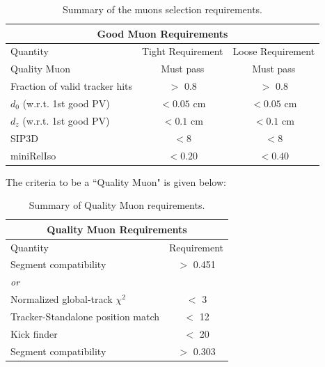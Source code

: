     \begin{table}[!h]
      \begin{center}
        \caption{\label{table:muons} Summary of the muons selection requirements. }
        \begin{tabular}{l|c|c}
          \hline
          \hline
          \multicolumn{3}{c}{Good Muon Requirements} \\
          \hline
          Quantity   &  Tight Requirement & Loose Requirement \\
          \hline
          Quality Muon                      & Must pass   & Must pass     \\
          Fraction of valid tracker hits    & $>$ 0.8     & $>$ 0.8  \\ 
          \hline
          $d_{0}$ (w.r.t. 1st good PV)   & $<0.05$ cm & $<0.05$ cm \\
          $d_{z}$ (w.r.t. 1st good PV)   & $<0.1$ cm  & $<0.1$ cm  \\
          SIP3D                          & $< 8$      & $< 8$      \\
          miniRelIso                     & $<0.20$    & $<0.40$       \\
          \hline
        \end{tabular}
      \end{center}
    \end{table}

    The criteria to be a ``Quality Muon" is given below:
    \begin{table}[!h]
      \begin{center}
        \caption{\label{table:muons} Summary of Quality Muon requirements.}
        \begin{tabular}{l|c}
          \hline
          \hline
          \multicolumn{2}{c}{Quality Muon Requirements} \\
          \hline
          Quantity   &  Requirement \\
          \hline
          Segment compatibility             &$>$ 0.451 \\
          \hline
          \emph{or} & \\
          \hline
          Normalized global-track $\chi^2$  & $<$ 3    \\
          Tracker-Standalone position match & $<$ 12   \\
          Kick finder                       & $<$ 20   \\
          Segment compatibility             & $>$ 0.303 \\
          \hline
          \hline
        \end{tabular}
      \end{center}
    \end{table}

